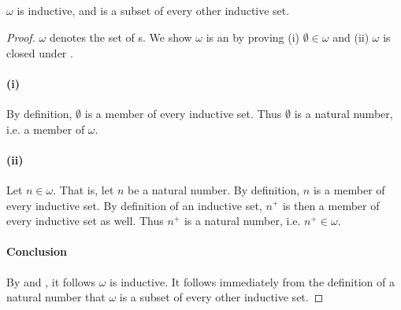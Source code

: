\documentclass{report}
\begin{document}
\subsection{}%

\begin{theorem}[4B]

  $\omega$ is inductive, and is a subset of every other inductive set.

\end{theorem}

\begin{proof}

  $\omega$ denotes the set of s.
  We show $\omega$ is an  by proving (i)
    $\emptyset \in \omega$ and (ii) $\omega$ is closed under
    .

  \paragraph{(i)}%

    By definition, $\emptyset$ is a member of every inductive set.
    Thus $\emptyset$ is a natural number, i.e. a member of $\omega$.

  \paragraph{(ii)}%

    Let $n \in \omega$.
    That is, let $n$ be a natural number.
    By definition, $n$ is a member of every inductive set.
    By definition of an inductive set, $n^+$ is then a member of every inductive
      set as well.
    Thus $n^+$ is a natural number, i.e. $n^+ \in \omega$.

  \paragraph{Conclusion}%

    By  and , it follows
      $\omega$ is inductive.
    It follows immediately from the definition of a natural number that $\omega$
      is a subset of every other inductive set.

\end{proof}

\subsection{}%
\end{document}
